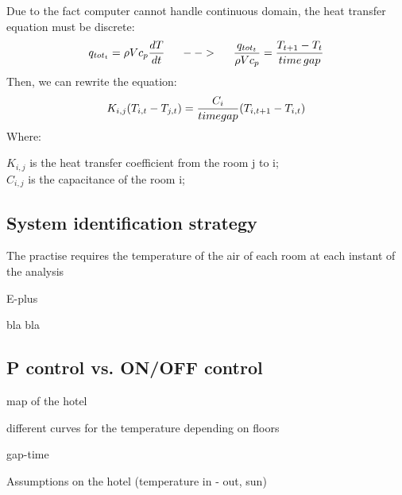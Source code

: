 Due to the fact computer cannot handle continuous domain, the heat transfer equation must be discrete:
$$q_{tot_{t}} = \rho V c_{p} \frac{d T}{d t} \hspace{5mm} --> \hspace{5mm} \frac{q_{tot_{t}}}{\rho V c_{p}} = \frac{T_{t+1} - T_{t}}{time \\ gap}$$
Then, we can rewrite the equation:
$$K_{i,j} (T_{i,t} - T_{j,t}) = \frac{C_{i}}{time \\ gap} (T_{i,t+1} - T_{i,t})$$
Where:

$K_{i,j}$ is the heat transfer coefficient from the room j to i; \\
$C_{i,j}$ is the capacitance of the room i;

\subsection{System identification strategy}
The practise requires the temperature of the air of each room at each instant of the analysis   



E-plus

bla bla

\subsection{P control vs. ON/OFF control}


map of the hotel

different curves for the temperature depending on floors

gap-time

Assumptions on the hotel (temperature in - out, sun)



